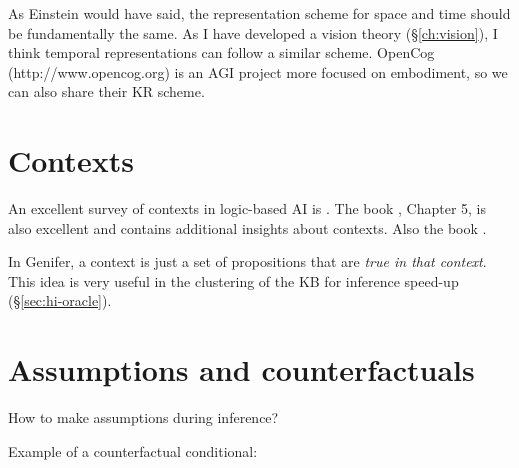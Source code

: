 As Einstein would have said, the representation scheme for space and time should be fundamentally the same.  As I have developed a vision theory (\S\ref{ch:vision}), I think temporal representations can follow a similar scheme.  OpenCog (http://www.opencog.org) is an AGI project more focused on embodiment, so we can also share their KR scheme.

\section{Contexts}

An excellent survey of contexts in logic-based AI is \citep*{Akman1996}.  The book \citep*{Sowa2000}, Chapter 5, is also excellent and contains additional insights about contexts.  Also the book \citep*{Bonzon2000}.

In Genifer, a context is just a set of propositions that are \textit{true in that context}.  This idea is very useful in the clustering of the KB for inference speed-up (\S\ref{sec:hi-oracle}).

\section{Assumptions and counterfactuals}

How to make assumptions during inference?  

Example of a counterfactual conditional:  
